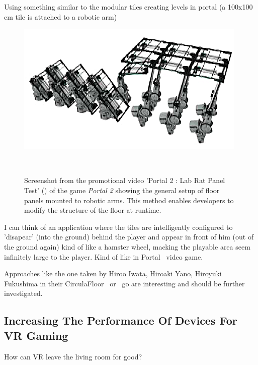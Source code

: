 Using something similar to the modular tiles creating levels in portal (a 100x100 cm tile is attached to a robotic arm)

\begin{figure}
	\centering
	\includegraphics[width=0.9\columnwidth]{./figures/portallabrattest}
	\caption[Portal 2 : Lab Rat Panel Test]{Screenshot from the promotional video 'Portal 2 : Lab Rat Panel Test' (\ccbyncsa) of the game \textit{Portal 2 \textregistered\textcopyright} showing the general setup of floor panels mounted to robotic arms. This method enables developers to modify the structure of the floor at runtime.\footnotemark}~\label{fig:portallabrattest}
\end{figure}

I can think of an application where the tiles are intelligently configured to 'disapear' (into the ground) behind the player and appear in front of him (out of the ground again) kind of like a hamster wheel, macking the playable area seem infinitely large to the player. Kind of like in Portal~\cite{game:portal} video game.

Approaches like the one taken by Hiroo Iwata, Hiroaki Yano, Hiroyuki Fukushima in their CirculaFloor~\cite{Iwata:2005:CLI:1078037.1079777} or~\cite{Souman:2010:MVW:1670671.1670675} go are interesting and should be further investigated. 


\subsection{Increasing The Performance Of Devices For VR Gaming}
How can VR leave the living room for good?


